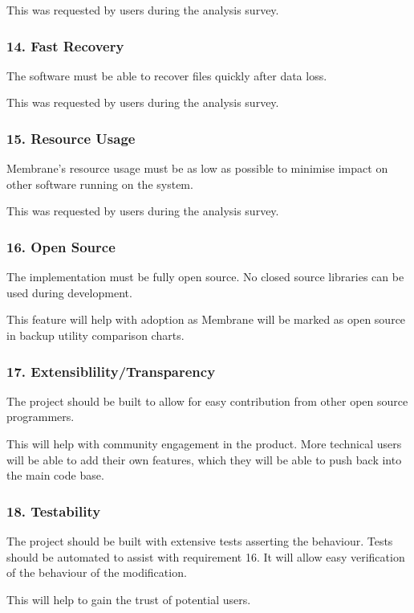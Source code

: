 \documentclass[a4paper, 11pt, twocolumn, twoside]{report}
\begin{document}
This was requested by users during the analysis survey.

\subsubsection{14. Fast Recovery}
The software must be able to recover files quickly after data loss.

This was requested by users during the analysis survey.

\subsubsection{15. Resource Usage}
Membrane's resource usage must be as low as possible to minimise impact on other software running on the system.

This was requested by users during the analysis survey.

\subsubsection{16. Open Source}

The implementation must be fully open source. No closed source libraries can be used during development.

This feature will help with adoption as Membrane will be marked as open source in backup utility comparison charts.

\subsubsection{17. Extensiblility/Transparency}

The project should be built to allow for easy contribution from other open source programmers.

This will help with community engagement in the product. More technical users will be able to add their own features, which they will be able to push back into the main code base.

\subsubsection{18. Testability}

The project should be built with extensive tests asserting the behaviour. Tests should be automated to assist with requirement 16. It will allow easy verification of the behaviour of the modification.

This will help to gain the trust of potential users.
\end{document}
